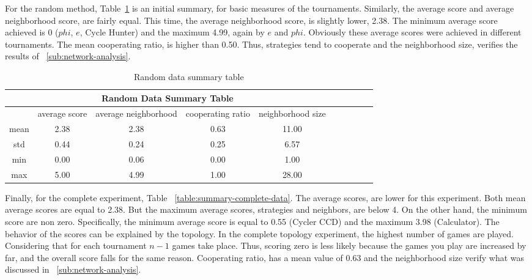 For the random method, Table~\ref{summary-random-data} is an initial summary,
for basic measures of the tournaments. Similarly, the average score and average
neighborhood score, are fairly equal. This time, the average neighborhood score,
is slightly lower, 2.38. The minimum average score achieved is 0 ($phi$, $e$, Cycle Hunter)
and the maximum 4.99, again by $e$ and $phi$. Obviously these average scores were achieved in
different tournaments. The mean cooperating ratio, is higher than 0.50.
Thus, strategies tend to cooperate and the neighborhood size, verifies the results
of ~\autoref{sub:network-analysis}.

\begin{table}[!hbtp]
	\centering
	\begin{adjustbox}{width=0.8\textwidth}
		\small
		\begin{tabular}{cccccccccc}
				\toprule
			\multicolumn{5}{|c|}{Random Data Summary Table}                                      \\ \hline
			     & average score & average neighborhood & cooperating ratio & neighborhood size \\ \hline
			mean & 2.38          & 2.38                 & 0.63              & 11.00             \\ \hline
			std  & 0.44          & 0.24                 & 0.25              & 6.57              \\ \hline
			min  & 0.00          & 0.06                 & 0.00              & 1.00              \\ \hline
			max  & 5.00          & 4.99                 & 1.00              & 28.00             \\ \bottomrule
		\end{tabular}
	\end{adjustbox}
	\caption{Random data summary table}
	\label{summary-random-data}
\end{table}

Finally, for the complete experiment, Table ~\ref{table:summary-complete-data}. The
average scores, are lower for this experiment. Both mean average scores are
equal to 2.38. But the maximum average scores, strategies and neighbors, are
below 4. On the other hand, the minimum score are non zero. Specifically,
the minimum average score is equal to 0.55 (Cycler CCD) and the maximum 3.98 (Calculator).
The behavior of the scores can be explained by the topology. In the complete topology experiment,
the highest number of games are played. Considering that for each tournament
\(n-1\) games take place. Thus, scoring zero is less likely because the games
you play are increased by far, and the overall score falls for the same reason.
Cooperating ratio, has a mean value of 0.63 and the neighborhood size
verify what was discussed in ~\autoref{sub:network-analysis}.

